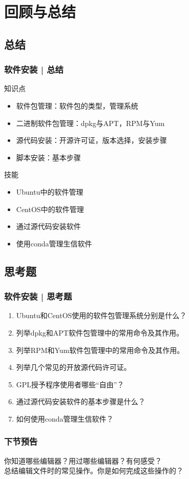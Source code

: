 \section{回顾与总结}
\subsection{总结}
\begin{frame}
  \frametitle{软件安装 | 总结}
  \begin{block}{知识点}
    \begin{itemize}
      \item 软件包管理：软件包的类型，管理系统
      \item 二进制软件包管理：dpkg与APT，RPM与Yum
      \item 源代码安装：开源许可证，版本选择，安装步骤
      \item 脚本安装：基本步骤
    \end{itemize}
  \end{block}
  \begin{block}{技能}
    \begin{itemize}
      \item Ubuntu中的软件管理
      \item CentOS中的软件管理
      \item 通过源代码安装软件
      \item 使用conda管理生信软件
    \end{itemize}
  \end{block}
\end{frame}

\subsection{思考题}
\begin{frame}
  \frametitle{软件安装 | 思考题}
  \begin{enumerate}
    \item Ubuntu和CentOS使用的软件包管理系统分别是什么？
    \item 列举dpkg和APT软件包管理中的常用命令及其作用。
    \item 列举RPM和Yum软件包管理中的常用命令及其作用。
    \item 列举几个常见的开放源代码许可证。
    \item GPL授予程序使用者哪些“自由”？
    \item 通过源代码安装软件的基本步骤是什么？
    \item 如何使用conda管理生信软件？
  \end{enumerate}
\end{frame}

\begin{frame}
  \frametitle{下节预告}
  你知道哪些编辑器？用过哪些编辑器？有何感受？\\
  总结编辑文件时的常见操作。你是如何完成这些操作的？
\end{frame}




